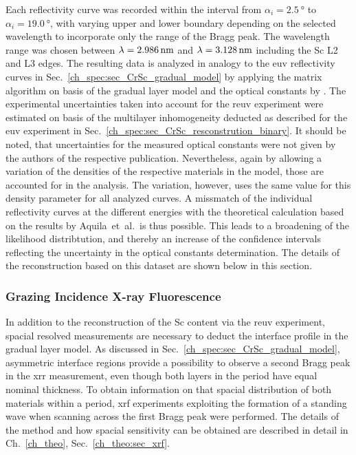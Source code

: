 Each reflectivity curve was recorded within the interval from $\alpha_i = \SI{2.5}{\degree}$ to $\alpha_i = \SI{19.0}{\degree}$, with varying upper and lower boundary depending on the selected wavelength to incorporate only the range of the Bragg peak. The wavelength range was chosen between $\lambda = \nm{2.986}$ and $\lambda = \nm{3.128}$ including the Sc L2 and L3 edges. The resulting data is analyzed in analogy to the \gls{euv} reflectivity curves in Sec.~\ref{ch_spec:sec_CrSc_gradual_model} by applying the matrix algorithm on basis of the gradual layer model and the optical constants by \textcite{aquila_measurements_2004}. The experimental uncertainties taken into account for the \gls{reuv} experiment were estimated on basis of the multilayer inhomogeneity deducted as described for the \gls{euv} experiment in Sec.~\ref{ch_spec:sec_CrSc_resconstrution_binary}. It should be noted, that uncertainties for the measured optical constants were not given by the authors of the respective publication. Nevertheless, again by allowing a variation of the densities of the respective materials in the model, those are accounted for in the analysis. The variation, however, uses the same value for this density parameter for all analyzed curves. A missmatch of the individual reflectivity curves at the different energies with the theoretical calculation based on the results by Aquila~et~al.~is thus possible. This leads to a broadening of the likelihood distribtution, and thereby an increase of the confidence intervals reflecting the uncertainty in the optical constants determination. The details of the reconstruction based on this dataset are shown below in this section.

\subsubsection{Grazing Incidence X-ray Fluorescence}
In addition to the reconstruction of the Sc content via the \gls{reuv} experiment, spacial resolved measurements are necessary to deduct the interface profile in the gradual layer model. As discussed in Sec.~\ref{ch_spec:sec_CrSc_gradual_model}, asymmetric interface regions provide a possibility to observe a second Bragg peak in the \gls{xrr} measurement, even though both layers in the period have equal nominal thickness. To obtain information on that spacial distribution of both materials within a period, \gls{xrf} experiments exploiting the formation of a standing wave when scanning across the first Bragg peak were performed. The details of the method and how spacial sensitivity can be obtained are described in detail in Ch.~\ref{ch_theo}, Sec.~\ref{ch_theo:sec_xrf}.

